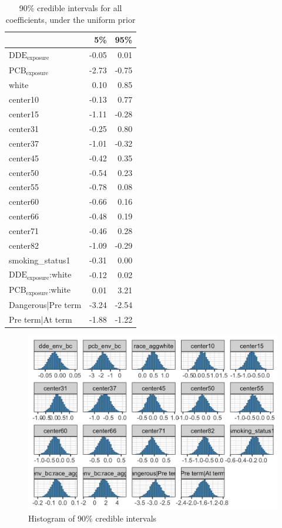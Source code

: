 \documentclass[wcp]{jmlr}%
\begin{document}
\begin{table}
	\begin{tabular}{lrr}
		\toprule
		  & 5\% & 95\%\\
		\midrule
		$\text{DDE}_{\text{exposure}}$ & -0.05 & 0.01\\
		$\text{PCB}_{\text{exposure}}$& -2.73 & -0.75\\
		white & 0.10 & 0.85\\
		center10 & -0.13 & 0.77\\
		center15 & -1.11 & -0.28\\
		\addlinespace
		center31 & -0.25 & 0.80\\
		center37 & -1.01 & -0.32\\
		center45 & -0.42 & 0.35\\
		center50 & -0.54 & 0.23\\
		center55 & -0.78 & 0.08\\
		\addlinespace
		center60 & -0.66 & 0.16\\
		center66 & -0.48 & 0.19\\
		center71 & -0.46 & 0.28\\
		center82 & -1.09 & -0.29\\
		smoking\_status1 & -0.31 & 0.00\\
		\addlinespace
		$\text{DDE}_{\text{exposure}}$:white & -0.12 & 0.02\\
		$\text{PCB}_{\text{exposure}}$:white & 0.01 & 3.21\\
		Dangerous|Pre term & -3.24 & -2.54\\
		Pre term|At term & -1.88 & -1.22\\
		\bottomrule
	\end{tabular}
    \label{tab:fullcoef}
    \caption{90\% credible intervals for all coefficients, under the uniform prior}
\end{table}

\begin{figure}
	\centering
	\includegraphics[width=\textwidth]{hists.jpeg}
	\caption{Histogram of 90\% credible intervals}
	\label{fig:hists}
\end{figure}
\end{document}

